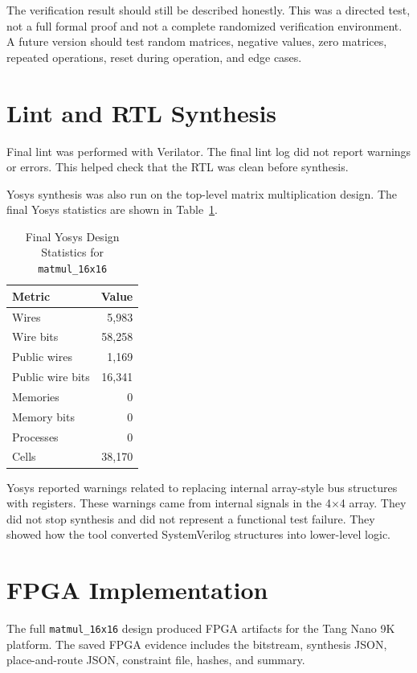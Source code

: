 \documentclass[conference]{IEEEtran}
\begin{document}
The verification result should still be described honestly. This was a directed test, not a full formal proof and not a complete randomized verification environment. A future version should test random matrices, negative values, zero matrices, repeated operations, reset during operation, and edge cases.

\section{Lint and RTL Synthesis}

Final lint was performed with Verilator. The final lint log did not report warnings or errors. This helped check that the RTL was clean before synthesis.

Yosys synthesis was also run on the top-level matrix multiplication design. The final Yosys statistics are shown in Table~\ref{tab:yosys}.

\begin{table}[h]
\centering
\caption{Final Yosys Design Statistics for \texttt{matmul\_16x16}}
\label{tab:yosys}
\begin{tabular}{lr}
\toprule
Metric & Value \\
\midrule
Wires & 5,983 \\
Wire bits & 58,258 \\
Public wires & 1,169 \\
Public wire bits & 16,341 \\
Memories & 0 \\
Memory bits & 0 \\
Processes & 0 \\
Cells & 38,170 \\
\bottomrule
\end{tabular}
\end{table}

Yosys reported warnings related to replacing internal array-style bus structures with registers. These warnings came from internal signals in the 4$\times$4 array. They did not stop synthesis and did not represent a functional test failure. They showed how the tool converted SystemVerilog structures into lower-level logic.

\section{FPGA Implementation}

The full \texttt{matmul\_16x16} design produced FPGA artifacts for the Tang Nano 9K platform. The saved FPGA evidence includes the bitstream, synthesis JSON, place-and-route JSON, constraint file, hashes, and summary.
\end{document}
